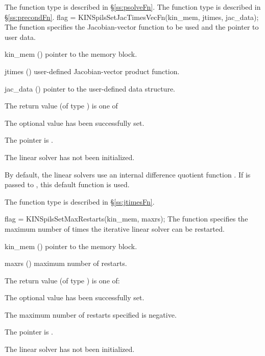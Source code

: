 {
   The function type  is described in \S\ref{ss:psolveFn}.
   The function type  is described in \S\ref{ss:precondFn}.
}
{
  flag = KINSpilsSetJacTimesVecFn(kin\_mem, jtimes, jac\_data);
}
{
  The function  specifies the Jacobian-vector 
  function to be used and the pointer to user data.
}
{
  \begin{args}
  \item[kin\_mem] ()
    pointer to the {\kinsol} memory block.
  \item[jtimes] ()
    user-defined Jacobian-vector product function.
  \item[jac\_data] ()
     pointer to the user-defined data structure.
  \end{args}
}
{
  The return value  (of type ) is one of
  \begin{args}
  \item[\Id{KINSPILS\_SUCCESS}] 
    The optional value has been successfully set.
  \item[\Id{KINSPILS\_MEM\_NULL}]
    The  pointer is .
  \item[\Id{KINSPILS\_LMEM\_NULL}]
    The {\kinspils} linear solver has not been initialized.
  \end{args}
}
{
  By default, the {\kinspils} linear solvers use an internal difference quotient 
  function .
  If  is passed to , this default function is used.

  The function type  is described in \S\ref{ss:jtimesFn}.
}
{
  flag = KINSpilsSetMaxRestarts(kin\_mem, maxrs);
}
{
  The function  specifies the maximum
  number of times the iterative linear solver can be restarted.
}
{
  \begin{args}
  \item[kin\_mem] ()
    pointer to the {\kinsol} memory block.
  \item[maxrs] ()
    maximum number of restarts.
  \end{args}
}
{
  The return value  (of type ) is one of:
  \begin{args}
  \item[\Id{KINSPILS\_SUCCESS}] 
    The optional value has been successfully set.
  \item[\Id{KINSPILS\_ILL\_INPUT}]
    The maximum number of restarts specified is negative.
  \item[\Id{KINSPILS\_MEM\_NULL}]
    The  pointer is .
  \item[\Id{KINSPILS\_LMEM\_NULL}]
    The linear solver has not been initialized.
  \end{args}
}
